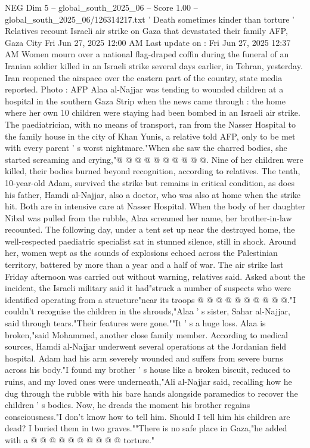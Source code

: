 \begin{textsample}{NEG Dim 5 – global\_south\_2025\_06 – Score 1.00 – global\_south\_2025\_06/126314217.txt}  \label{ex:f5_neg_417}
' Death sometimes kinder than torture ' Relatives recount Israeli air strike on Gaza that devastated their family AFP, Gaza City Fri Jun 27, 2025 12:00 AM Last update on : Fri Jun 27, 2025 12:37 AM Women mourn over a national flag-draped coffin during the funeral of an Iranian soldier killed in an Israeli strike several days earlier, in Tehran, yesterday.
Iran reopened the airspace over the eastern part of the country, state media reported.
Photo : AFP Alaa al-Najjar was tending to wounded children at a hospital in the southern Gaza Strip when the news came through : the home where her own 10 children were staying had been bombed in an Israeli air strike.
The paediatrician, with no means of transport, ran from the Nasser Hospital to the family house in the city of Khan Yunis, a relative told AFP, only to be met with every parent ' s worst nightmare."When she saw the charred bodies, she started screaming and crying,"@ @ @ @ @ @ @ @ @ @.
Nine of her children were killed, their bodies burned beyond recognition, according to relatives.
The tenth, 10-year-old Adam, survived the strike but remains in critical condition, as does his father, Hamdi al-Najjar, also a doctor, who was also at home when the strike hit.
Both are in intensive care at Nasser Hospital.
When the body of her daughter Nibal was pulled from the rubble, Alaa screamed her name, her brother-in-law recounted.
The following day, under a tent set up near the destroyed home, the well-respected paediatric specialist sat in stunned silence, still in shock.
Around her, women wept as the sounds of explosions echoed across the Palestinian territory, battered by more than a year and a half of war.
The air strike last Friday afternoon was carried out without warning, relatives said.
Asked about the incident, the Israeli military said it had"struck a number of suspects who were identified operating from a structure"near its troops @ @ @ @ @ @ @ @ @ @."I couldn't recognise the children in the shrouds,"Alaa ' s sister, Sahar al-Najjar, said through tears."Their features were gone.""It ' s a huge loss.
Alaa is broken,"said Mohammed, another close family member.
According to medical sources, Hamdi al-Najjar underwent several operations at the Jordanian field hospital.
Adam had his arm severely wounded and suffers from severe burns across his body."I found my brother ' s house like a broken biscuit, reduced to ruins, and my loved ones were underneath,"Ali al-Najjar said, recalling how he dug through the rubble with his bare hands alongside paramedics to recover the children ' s bodies.
Now, he dreads the moment his brother regains consciousness."I don't know how to tell him.
Should I tell him his children are dead?
I buried them in two graves.""There is no safe place in Gaza,"he added with a @ @ @ @ @ @ @ @ @ @ torture."

\end{textsample}
